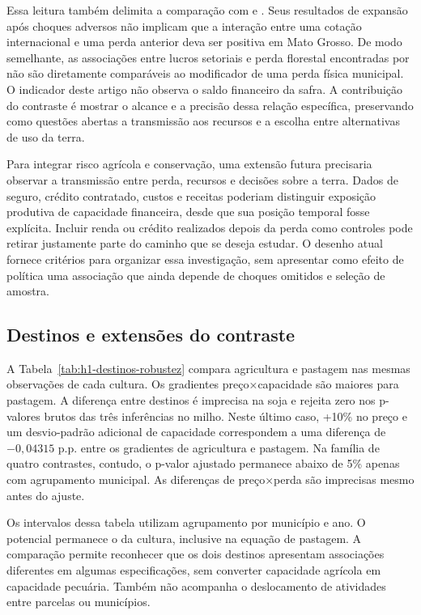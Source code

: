 Essa leitura também delimita a comparação com  e . Seus resultados de expansão após choques adversos não implicam que a interação entre uma cotação internacional e uma perda anterior deva ser positiva em Mato Grosso. De modo semelhante, as associações entre lucros setoriais e perda florestal encontradas por  não são diretamente comparáveis ao modificador de uma perda física municipal. O indicador deste artigo não observa o saldo financeiro da safra. A contribuição do contraste é mostrar o alcance e a precisão dessa relação específica, preservando como questões abertas a transmissão aos recursos e a escolha entre alternativas de uso da terra.

Para integrar risco agrícola e conservação, uma extensão futura precisaria observar a transmissão entre perda, recursos e decisões sobre a terra. Dados de seguro, crédito contratado, custos e receitas poderiam distinguir exposição produtiva de capacidade financeira, desde que sua posição temporal fosse explícita. Incluir renda ou crédito realizados depois da perda como controles pode retirar justamente parte do caminho que se deseja estudar. O desenho atual fornece critérios para organizar essa investigação, sem apresentar como efeito de política uma associação que ainda depende de choques omitidos e seleção de amostra.

\subsection{Destinos e extensões do contraste}

A Tabela~\ref{tab:h1-destinos-robustez} compara agricultura e pastagem nas mesmas observações de cada cultura. Os gradientes preço×capacidade são maiores para pastagem. A diferença entre destinos é imprecisa na soja e rejeita zero nos p-valores brutos das três inferências no milho. Neste último caso, +10\% no preço e um desvio-padrão adicional de capacidade correspondem a uma diferença de $-0,04315$ p.p. entre os gradientes de agricultura e pastagem. Na família de quatro contrastes, contudo, o p-valor ajustado permanece abaixo de 5\% apenas com agrupamento municipal. As diferenças de preço×perda são imprecisas mesmo antes do ajuste.




Os intervalos dessa tabela utilizam agrupamento por município e ano. O potencial permanece o da cultura, inclusive na equação de pastagem. A comparação permite reconhecer que os dois destinos apresentam associações diferentes em algumas especificações, sem converter capacidade agrícola em capacidade pecuária. Também não acompanha o deslocamento de atividades entre parcelas ou municípios.

